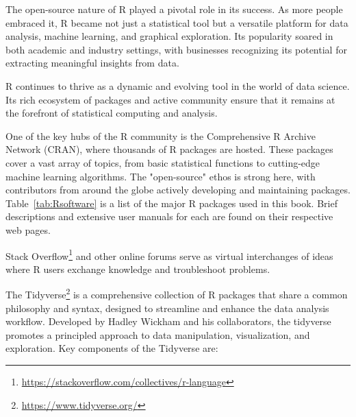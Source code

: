 \begin{withcode}
The open-source nature of R played a pivotal role in its success. As more people embraced it, R became not just a statistical tool but a versatile platform for data analysis, machine learning, and graphical exploration. Its popularity soared in both academic and industry settings, with businesses recognizing its potential for extracting meaningful insights from data.

R continues to thrive as a dynamic and evolving tool in the world of data science. Its rich ecosystem of packages and active community ensure that it remains at the forefront of statistical computing and analysis. 

One of the key hubs of the R community is the Comprehensive R Archive Network (CRAN), where thousands of R packages are hosted. These packages cover a vast array of topics, from basic statistical functions to cutting-edge machine learning algorithms. The "open-source" ethos is strong here, with contributors from around the globe actively developing and maintaining packages. Table~\ref{tab:Rsoftware} is a list of the major R packages used in this book. Brief descriptions and extensive user manuals for each are found on their respective web pages.

Stack Overflow\footnote{\url{https://stackoverflow.com/collectives/r-language}} and other online forums serve as virtual interchanges of ideas where R users exchange knowledge and troubleshoot problems.

The Tidyverse\footnote{\url{https://www.tidyverse.org/}} is a comprehensive collection of R packages that share a common philosophy and syntax, designed to streamline and enhance the data analysis workflow. Developed by Hadley Wickham and his collaborators, the tidyverse promotes a principled approach to data manipulation, visualization, and exploration. Key components of the Tidyverse are:

\begin{table}
\small
\centering


\end{table}
\end{withcode}
